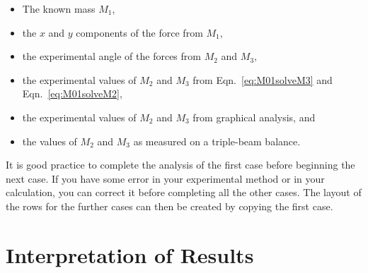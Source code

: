 \begin{itemize}
\begin{itemize}
      \item The known mass $M_1$,
      \item the $x$ and $y$ components of the force from $M_1$,
      \item the experimental angle of the forces from $M_2$ and $M_3$,
      \item the experimental values of $M_2$ and $M_3$ from Eqn.~\ref{eq:M01solveM3} and Eqn.~\ref{eq:M01solveM2},
      \item the experimental values of $M_2$ and $M_3$ from graphical analysis, and
      \item the values of $M_2$ and $M_3$ as measured on a triple-beam balance.
    \end{itemize}
\end{itemize}

It is good practice to complete the analysis of the first case before beginning the next case. If you have some error in your experimental method or in your calculation, you can correct it before completing all the other cases. The layout of the rows for the further cases can then be created by copying the first case.














\section{Interpretation of Results}

